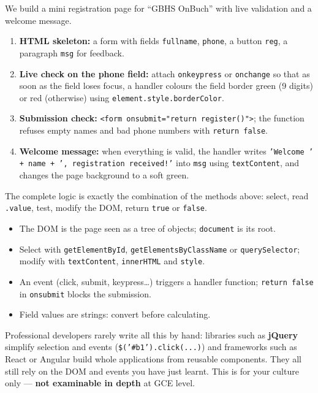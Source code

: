 \documentclass[11pt]{article}
\begin{document}
\begin{experience}
We build a mini registration page for ``GBHS OnBuch'' with live validation and a welcome message.
\begin{enumerate}
\item \textbf{HTML skeleton:} a form with fields \texttt{fullname}, \texttt{phone}, a button \texttt{reg}, a paragraph \texttt{msg} for feedback.
\item \textbf{Live check on the phone field:} attach \texttt{onkeypress} or \texttt{onchange} so that as soon as the field loses focus, a handler colours the field border green (9 digits) or red (otherwise) using \texttt{element.style.borderColor}.
\item \textbf{Submission check:} \texttt{<form onsubmit="return register()">}; the function refuses empty names and bad phone numbers with \texttt{return false}.
\item \textbf{Welcome message:} when everything is valid, the handler writes \texttt{'Welcome ' + name + ', registration received!'} into \texttt{msg} using \texttt{textContent}, and changes the page background to a soft green.
\end{enumerate}
The complete logic is exactly the combination of the methods above: select, read \texttt{.value}, test, modify the DOM, return \texttt{true} or \texttt{false}.
\end{experience}

\begin{aretenir}
\begin{itemize}
\item The DOM is the page seen as a tree of objects; \texttt{document} is its root.
\item Select with \texttt{getElementById}, \texttt{getElementsByClassName} or \texttt{querySelector}; modify with \texttt{textContent}, \texttt{innerHTML} and \texttt{style}.
\item An event (click, submit, keypress\ldots) triggers a handler function; \texttt{return false} in \texttt{onsubmit} blocks the submission.
\item Field values are strings: convert before calculating.
\end{itemize}
\end{aretenir}

\begin{savaistu}
Professional developers rarely write all this by hand: libraries such as \textbf{jQuery} simplify selection and events (\texttt{\$('\#b1').click(...)}) and frameworks such as React or Angular build whole applications from reusable components. They all still rely on the DOM and events you have just learnt. This is for your culture only — \textbf{not examinable in depth} at GCE level.
\end{savaistu}
\end{document}
